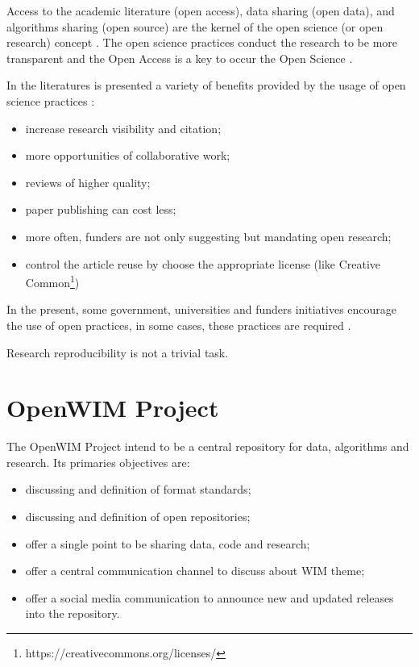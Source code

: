 \documentclass[a4paper]{article}
\begin{document}
{Access to the academic literature (open access), data sharing (open data), and algorithms sharing (open source) are the kernel of the open science (or open research) concept \cite{article:the-open-research-value-proposition}. The open science practices conduct the research to be more transparent \cite{dorch2015open} and the Open Access is a key to occur the Open Science \cite{margoni2016open}.

In the literatures is presented a variety of benefits provided by the usage of open science practices \cite{article:the-open-research-value-proposition}:

\begin{itemize}
\item increase research visibility and citation;
\item more opportunities of collaborative work;
\item reviews of higher quality;
\item paper publishing can cost less;
\item more often, funders are not only suggesting but mandating open research;
\item control the article reuse by choose the appropriate license (like Creative Common\footnote{https://creativecommons.org/licenses/})
\end{itemize}

In the present, some government, universities and funders initiatives encourage the use of open practices, in some cases, these practices are required \cite{article:the-open-research-value-proposition}.

Research reproducibility is not a trivial task. \cite{open2015estimating}	

\section{OpenWIM Project}\label{open-wim}

The OpenWIM Project intend to be a central repository for data, algorithms and research. Its primaries objectives are:

\begin{itemize}
\item discussing and definition of format standards;
\item discussing and definition of open repositories;
\item offer a single point to be sharing data, code and research;
\item offer a central communication channel to discuss about WIM theme;
\item offer a social media communication to announce new and updated releases into the repository.
\end{itemize}

}
\end{document}
